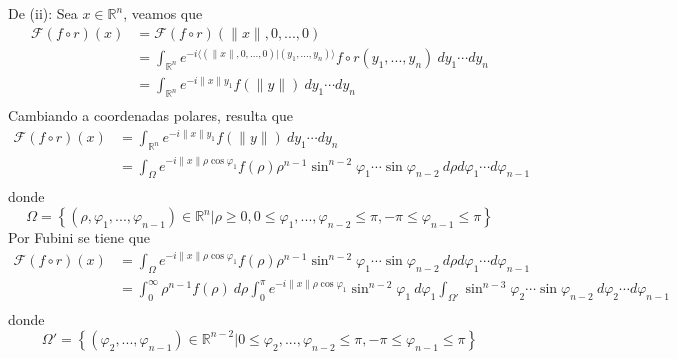 \documentclass[12pt]{report}
\theoremstyle{largebreak}
\renewcommand{\leq}{\ensuremath{\leqslant}}
\renewcommand{\geq}{\ensuremath{\geqslant}}
\newcommand\norm[1]{\ensuremath{\|#1\|}}
\newcommand\pint[2]{\ensuremath{\langle#1| #2\rangle}}
\newcommand{\fou}[1]{\ensuremath{\mathcal{F}#1}}
\begin{document}
\begin{sol}
        De (ii): Sea $x\in\mathbb{R}^n$, veamos que
        \begin{equation*}
            \begin{split}
                \fou{(f\circ r)}(x)&=\fou{(f\circ r)}(\norm{x},0,...,0)\\
                &=\int_{\mathbb{R}^n}e^{-i\pint{(\norm{x},0,...,0)}{(y_1,...,y_n)}}f\circ r(y_1,...,y_n)\:dy_1\cdots dy_n\\
                &=\int_{\mathbb{R}^n}e^{ -i\norm{x}y_1}f(\norm{y})\:dy_1\cdots dy_n\\
            \end{split}
        \end{equation*}
        Cambiando a coordenadas polares, resulta que
        \begin{equation*}
            \begin{split}
                \fou{(f\circ r)}(x)&=\int_{\mathbb{R}^n}e^{ -i\norm{x}y_1}f(\norm{y})\:dy_1\cdots dy_n\\
                &=\int_{\Omega}e^{ -i\norm{x}\rho\cos\varphi_1}f(\rho)\rho^{ n-1}\sin^{ n-2}\varphi_1\cdots\sin\varphi_{ n-2} \: d\rho d\varphi_1\cdots d\varphi_{ n-1}\\
            \end{split}
        \end{equation*}
        donde
        \begin{equation*}
            \Omega=\left\{(\rho,\varphi_1,...,\varphi_{ n-1})\in\mathbb{R}^n\Big|\rho\geq0,0\leq\varphi_1,...,\varphi_{ n-2}\leq\pi,-\pi\leq\varphi_{ n-1}\leq\pi \right\}
        \end{equation*}
        Por Fubini se tiene que
        \begin{equation*}
            \begin{split}
                \fou{(f\circ r)}(x)&=\int_{\Omega}e^{ -i\norm{x}\rho\cos\varphi_1}f(\rho)\rho^{ n-1}\sin^{ n-2}\varphi_1\cdots\sin\varphi_{ n-2} \: d\rho d\varphi_1\cdots d\varphi_{ n-1}\\
                &=\int_{0}^\infty \rho^{ n-1}f(\rho)\:d\rho \int_{0}^\pi e^{ -i\norm{x}\rho\cos\varphi_1}\sin^{ n-2}\varphi_1\:d\varphi_1 \int_{\Omega'} \sin^{ n-3}\varphi_2\cdots\sin\varphi_{ n-2} \: d\varphi_{2}\cdots d\varphi_{ n-1}\\
            \end{split}
        \end{equation*}
        donde
        \begin{equation*}
            \Omega'=\left\{(\varphi_2,...,\varphi_{ n-1})\in\mathbb{R}^{n-2}\Big|0\leq\varphi_2,...,\varphi_{ n-2}\leq\pi,-\pi\leq\varphi_{ n-1}\leq\pi \right\}

\end{equation*}
\end{sol}
\end{document}
